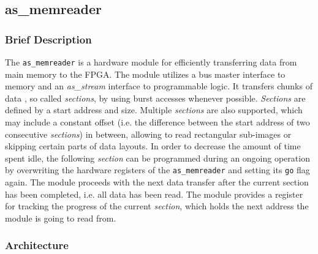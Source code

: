 

\subsection{as\_memreader}\label{ch:07-basic-mods-in_out-memreader}


\subsubsection{Brief Description}
The \texttt{as\_memreader} is a hardware module for efficiently transferring data from main memory to the FPGA.
The module utilizes a bus master interface to memory and an \textit{as\_stream} interface to programmable logic.
It transfers chunks of data , so called \textit{sections}, by using burst accesses whenever possible.
\textit{Sections} are defined by a start address and size.
Multiple \textit{sections} are also supported, which may include a constant offset (i.e. the difference between the start address of two consecutive \textit{sections}) in between, allowing to read rectangular sub-images or skipping certain parts of data layouts.
In order to decrease the amount of time spent idle, the following \textit{section} can be programmed during an ongoing operation by overwriting the hardware registers of the \texttt{as\_memreader} and setting its \texttt{go} flag again.
The module proceeds with the next data transfer after the current section has been completed, i.e. all data has been read.
The module provides a register for tracking the progress of the current \textit{section}, which holds the next address the module is going to read from.

\subsubsection{Architecture}

